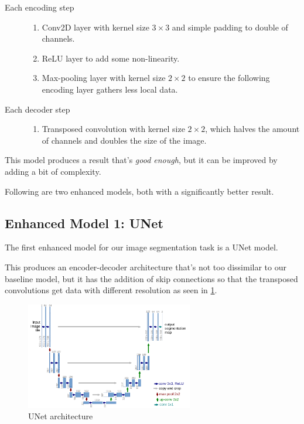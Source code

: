 \begin{description}
	\item[Each encoding step] \phantom{hello}
		\begin{enumerate}
			\item Conv2D layer with kernel size $3 \times 3$ and simple padding to double of channels.
			\item ReLU layer to add some non-linearity.
			\item Max-pooling layer with kernel size $2 \times 2$ to ensure the following encoding layer gathers less local data.
		\end{enumerate}
	\item[Each decoder step] \phantom{hello}
		\begin{enumerate}
			\item Transposed convolution with kernel size $2 \times 2$, which halves the amount of channels and doubles the size of the image.
		\end{enumerate}
\end{description}

This model produces a result that's \textit{good enough}, but it can be improved by adding a bit of complexity.

Following are two enhanced models, both with a significantly better result.

\newpage{}
\subsection{Enhanced Model 1: UNet }

The first enhanced model for our image segmentation task is a UNet model\cite{unet}.

This produces an encoder-decoder architecture that's not too dissimilar to our baseline model, but it has the addition of skip connections so that the transposed convolutions get data with different resolution as seen in \cref{unet}.

\begin{figure}[h]
    \centering 
    \includegraphics[width=0.65\textwidth]{u-net-illustration-correct-scale2.pdf}
    \caption{UNet architecture}
    \label{unet}
\end{figure}

